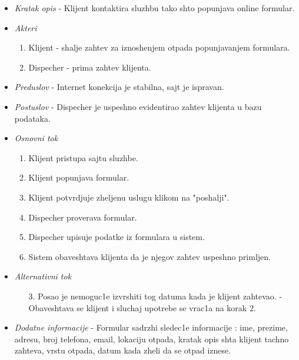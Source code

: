 \documentclass[10 pt]{article}
\begin{document}
		\begin{itemize}
			
			\item\textit{Kratak opis}
- Klijent kontaktira sluzhbu tako shto popunjava online formular.

			
			\item\textit{Akteri} 
				\begin{enumerate}
					\item Klijent - shalje zahtev za iznoshenjem otpada popunjavanjem formulara.
					\item Dispecher - prima zahtev klijenta.
				\end{enumerate}

			
			\item\textit{Preduslov}
- Internet konekcija je stabilna, sajt je ispravan.

			
			\item\textit{Postuslov}
- Dispecher je uspeshno evidentirao zahtev klijenta u bazu podataka.

			
			\item\textit{Osnovni tok} 
				\begin{enumerate}
					\item Klijent pristupa sajtu sluzhbe.

					\item Klijent popunjava formular.

					\item Klijent potvrdjuje zheljenu uslugu klikom na "poshalji".

					\item Dispecher proverava formular.

					\item Dispecher upisuje podatke iz formulara u sistem.

					\item Sistem obaveshtava klijenta da je njegov zahtev uspeshno primljen.

				\end{enumerate}
		
			\item\textit{Alternativni tok}
				\begin{enumerate}
					\item [3.] Posao je nemoguc1e izvrshiti tog datuma kada je klijent zahtevao. - Obaveshtava se klijent i sluchaj upotrebe se vrac1a na korak 2.

				\end{enumerate}

			
			\item\textit{Dodatne informacije}
- Formular sadrzhi sledec1e informacije : ime, prezime, adresu, broj telefona, email, lokaciju otpada, kratak opis shta klijent tachno zahteva, vrstu otpada, datum kada zheli da se otpad iznese.
			

		\end{itemize}
	
\end{document}
